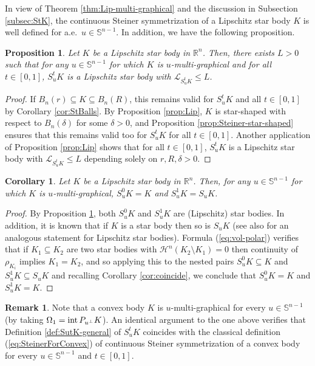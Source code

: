 \documentclass[11pt]{article}
\newtheorem{cor}[thm]{Corollary}
\newtheorem{prop}[thm]{Proposition}
\theoremstyle{definition}
\newtheorem{rem}[thm]{\textbf{Remark}}
\theoremstyle{proof}
\DeclareMathOperator{\+}{\mathop{\tilde{+}}}
\DeclareMathOperator{\interior}{\textnormal{int}}
\newcommand{\Lip}{\mathcal{L}}
\newcommand{\R}{\mathbb{R}}
\renewcommand{\S}{\mathbb{S}}
\renewcommand{\H}{\mathcal{H}}
\numberwithin{equation}{section}
\numberwithin{equation}{section}
\begin{document}
In view of Theorem \ref{thm:Lip-multi-graphical} and the discussion in Subsection \ref{subsec:StK}, the continuous Steiner symmetrization of a Lipschitz star body $K$ is well defined for a.e.~$u \in \S^{n-1}$. In addition, we have the following 
proposition. 
\begin{prop} \label{prop:StRemainsLip}
Let $K$ be a Lipschitz star body in $\R^n$. Then, there exists $L > 0$ such that for any $u \in \S^{n-1}$ for which $K$ is $u$-multi-graphical and for all $t \in [0,1]$, $S_u^t K$ is a Lipschitz star body with $\Lip_{S_u^t K} \leq L$.  
\end{prop}
\begin{proof}
If $B_n(r) \subseteq K \subseteq B_n(R)$, this remains valid for $S_u^t K$ and all $t \in [0,1]$ by Corollary \ref{cor:StBalls}. By Proposition \ref{prop:Lip}, $K$ is star-shaped with respect to $B_n(\delta)$ for some $\delta > 0$, and Proposition \ref{prop:Steiner-star-shaped} ensures that this remains valid too for $S_u^t K$ for all $t \in [0,1]$. Another application of Proposition \ref{prop:Lip} shows that for all $t \in [0,1]$, $S_u^t K$ is a Lipschitz star body with $\Lip_{S_u^t K} \leq L$ depending solely on $r,R,\delta > 0$. 
\end{proof}
\begin{cor} \label{cor:Su01}
Let $K$ be a Lipschitz star body in $\R^n$. Then, for any $u \in \S^{n-1}$ for which $K$ is $u$-multi-graphical, $S_u^0 K = K$ and $S_u^1 K = S_u K$.
\end{cor}
\begin{proof}
By Proposition \ref{prop:StRemainsLip}, both $S_u^0 K$ and $S_u^1 K$ are (Lipschitz) star bodies. In addition, it is known that if $K$ is a star body then so is $S_u K$ \cite[Theorem 3.3]{Zhu-OrliczCentroidInqForStarBodies} (see also \cite[Lemma 5.1]{LinWu-LipschitzStarBodiesReview} for an analogous statement for Lipschitz star bodies). Formula (\ref{eq:vol-polar}) verifies that if $K_1 \subseteq K_2$ are two star bodies with $\H^n(K_2 \setminus K_1) = 0$ then continuity of $\rho_{K_i}$ implies $K_1 = K_2$, and so applying this to 
the nested pairs $S_u^0 K \subseteq K$ and $S_u^1 K \subseteq S_u K$ and recalling Corollary \ref{cor:coincide}, we conclude that $S_u^0 K = K$ and $S_u^1 K = K$.  
\end{proof}
\begin{rem}
Note that a convex body $K$ is $u$-multi-graphical for every $u \in \S^{n-1}$ (by taking $\Omega_1 = \interior P_{u^{\perp}} K$). 
An identical argument to the one above verifies that Definition \ref{def:SutK-general} of $S_u^t K$ coincides with the classical definition  (\ref{eq:SteinerForConvex}) of continuous Steiner symmetrization of a convex body for every $u \in \S^{n-1}$ and $t \in [0,1]$. 
\end{rem}
\end{document}
